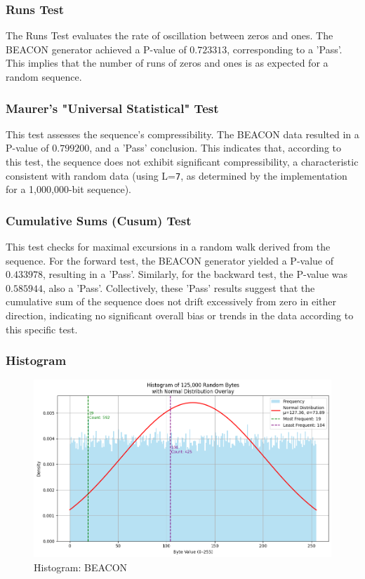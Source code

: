 \subsubsection{\textbf{Runs Test}}
The Runs Test evaluates the rate of oscillation between zeros and ones. The BEACON generator achieved a P-value of $0.723313$, corresponding to a 'Pass'. This implies that the number of runs of zeros and ones is as expected for a random sequence.

\subsubsection{\textbf{Maurer's "Universal Statistical" Test}}
This test assesses the sequence's compressibility. The BEACON data resulted in a P-value of $0.799200$, and a 'Pass' conclusion. This indicates that, according to this test, the sequence does not exhibit significant compressibility, a characteristic consistent with random data (using L=\texttt{7}, as determined by the implementation for a 1,000,000-bit sequence).

\subsubsection{\textbf{Cumulative Sums (Cusum) Test}}
This test checks for maximal excursions in a random walk derived from the sequence. For the forward test, the BEACON generator yielded a P-value of $0.433978$, resulting in a 'Pass'. Similarly, for the backward test, the P-value was $0.585944$, also a 'Pass'. Collectively, these 'Pass' results suggest that the cumulative sum of the sequence does not drift excessively from zero in either direction, indicating no significant overall bias or trends in the data according to this specific test.

\subsubsection{\textbf{Histogram}}


\begin{figure}[htbp] 
    \centering 
    \includegraphics[width=0.9\columnwidth]{images/HIST_Beacon.png} 
    \caption{Histogram: BEACON}
    \label{fig:H:BEACON}
\end{figure}

